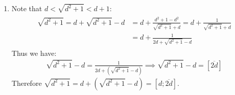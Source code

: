 \begin{enumerate}[label=]
    \item 
        Note that $d < \sqrt{d^2 + 1} < d+1$:
        \begin{gather*}
            \begin{split}
                \sqrt{d^2 + 1} = d + \sqrt{d^2 + 1} - d   &= d + \frac{d^2 + 1 - d^2}{\sqrt{d^2 + 1} + d} = d + \frac{1}{\sqrt{d^2 + 1} + d} \\
                &= d + \frac{1}{2d + \sqrt{d^2 + 1} - d}
            \end{split}
        \end{gather*}
        Thus we have:
        \begin{gather*}
            \sqrt{d^2 + 1} - d = \frac{1}{2d + (\sqrt{d^2 + 1} - d)} \implies \sqrt{d^2 + 1} - d = [\overline{2d}]
        \end{gather*}
        Therefore $\sqrt{d^2 + 1} = d +(\sqrt{d^2 + 1} - d) = [d; \overline{2d}]$.
\end{enumerate}